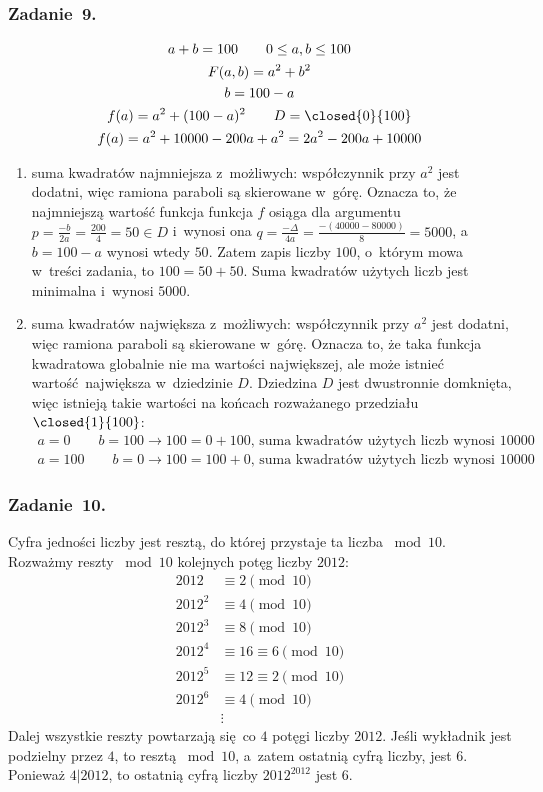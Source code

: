 \subsubsection*{Zadanie~9.}
\begin{gather*}
    a + b = 100 \qquad 0 \leq a, b \leq 100\\
    F(a, b) = a^2 + b^2\\
    b = 100 - a\\
    f(a) = a^2 + (100 - a)^2 \qquad D = \closed{0}{100}\\
    f(a) = a^2 + 10000 - 200a + a^2 = 2a^2 - 200a + 10000
\end{gather*}
\begin{enumerate}[label={\alph*)}]
    \item suma kwadratów najmniejsza z~możliwych: współczynnik przy \(a^2\) jest dodatni, więc ramiona paraboli są skierowane w~górę. Oznacza to, że najmniejszą wartość funkcja funkcja \(f\) osiąga dla argumentu \(p = \frac{-b}{2a} = \frac{200}{4} = 50 \in D\) i~wynosi ona \(q = \frac{-\Delta}{4a} = \frac{-(40000 - 80000)}{8} = 5000\), a~\(b = 100 - a\) wynosi wtedy \(50\). Zatem zapis liczby \(100\), o~którym mowa w~treści zadania, to \(100 = 50 + 50\). Suma kwadratów użytych liczb jest minimalna i~wynosi \(5000\).
    \item suma kwadratów największa z~możliwych: współczynnik przy \(a^2\) jest dodatni, więc ramiona paraboli są skierowane w~górę. Oznacza to, że taka funkcja kwadratowa globalnie nie ma wartości największej, ale może istnieć wartość największa w~dziedzinie \(D\). Dziedzina \(D\) jest dwustronnie domknięta, więc istnieją takie wartości na końcach rozważanego przedziału \(\closed{1}{100}\):
        \begin{gather*}
            a = 0 \qquad b = 100 \longrightarrow 100 = 0 + 100 \text{, suma kwadratów użytych liczb wynosi } 10000\\
            a = 100 \qquad b = 0 \longrightarrow 100 = 100 + 0 \text{, suma kwadratów użytych liczb wynosi } 10000
        \end{gather*}
\end{enumerate}
\subsubsection*{Zadanie~10.}
Cyfra jedności liczby jest resztą, do której przystaje ta liczba \({} \bmod 10\). Rozważmy reszty \({} \bmod 10\) kolejnych potęg liczby \(2012\):
\begin{align*}
    2012 &\equiv 2 \pmod{10}\\
    2012^2 &\equiv 4 \pmod{10}\\
    2012^3 &\equiv 8 \pmod{10}\\
    2012^4 &\equiv 16 \equiv 6 \pmod{10}\\
    2012^5 &\equiv 12 \equiv 2 \pmod{10}\\
    2012^6 &\equiv 4 \pmod{10}\\
    &\vdots
\end{align*}
Dalej wszystkie reszty powtarzają się co \(4\) potęgi liczby \(2012\). Jeśli wykładnik jest podzielny przez \(4\), to resztą \({} \bmod 10\), a~zatem ostatnią cyfrą liczby, jest \(6\). Ponieważ \(4 \vert 2012\), to ostatnią cyfrą liczby \(2012^{2012}\) jest \(6\).
